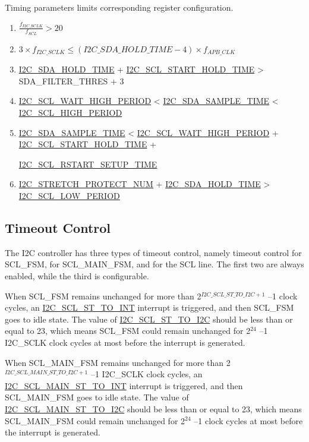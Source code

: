 \documentclass[main\_\_EN.tex]{subfiles}
\begin{document}
Timing parameters limits corresponding register configuration.
\begin{enumerate}
\item $\frac{f_{I2C\_SCLK}}{f_{SCL}}  > 20$
\item $3 \times f_{I2C\_SCLK} \leq (\hyperref[fielddesc:I2CSDAHOLDTIME]{I2C\_SDA\_HOLD\_TIME}-4) \times f_{APB\_CLK}$
\item \hyperref[fielddesc:I2CSDAHOLDTIME]{I2C\_SDA\_HOLD\_TIME} + \hyperref[fielddesc:I2CSCLSTARTHOLDTIME]{I2C\_SCL\_START\_HOLD\_TIME} > SDA\_FILTER\_THRES + 3
\item \hyperref[fielddesc:I2CSCLWAITHIGHPERIOD]{I2C\_SCL\_WAIT\_HIGH\_PERIOD} < \hyperref[fielddesc:I2CSDASAMPLETIME]{I2C\_SDA\_SAMPLE\_TIME} < \hyperref[fielddesc:I2CSCLHIGHPERIOD]{I2C\_SCL\_HIGH\_PERIOD}
\item \hyperref[fielddesc:I2CSDASAMPLETIME]{I2C\_SDA\_SAMPLE\_TIME} < \hyperref[fielddesc:I2CSCLWAITHIGHPERIOD]{I2C\_SCL\_WAIT\_HIGH\_PERIOD} + \hyperref[fielddesc:I2CSCLSTARTHOLDTIME]{I2C\_SCL\_START\_HOLD\_TIME} +

\hyperref[fielddesc:I2CSCLRSTARTSETUPTIME]{I2C\_SCL\_RSTART\_SETUP\_TIME}
\item \hyperref[fielddesc:I2CSTRETCHPROTECTNUM]{I2C\_STRETCH\_PROTECT\_NUM} + \hyperref[fielddesc:I2CSDAHOLDTIME]{I2C\_SDA\_HOLD\_TIME} > \hyperref[fielddesc:I2CSCLLOWPERIOD]{I2C\_SCL\_LOW\_PERIOD}
\end{enumerate}

\subsection{Timeout Control}
The I2C controller has three types of timeout control, namely timeout control for SCL\_FSM, for SCL\_MAIN\_FSM, and for the SCL line. The first two are always enabled, while the third is configurable.

When SCL\_FSM remains unchanged for more than 2$^{\hyperref[fielddesc:I2CSCLSTTOI2C]{I2C\_SCL\_ST\_TO\_I2C}+1}$ –1 clock cycles, an \hyperref[int:i2c-scl-fsm]{I2C\_SCL\_ST\_TO\_INT} interrupt is triggered, and then SCL\_FSM goes to idle state. The value of \hyperref[fielddesc:I2CSCLSTTOI2C]{I2C\_SCL\_ST\_TO\_I2C} should be less than or equal to 23, which means SCL\_FSM could remain unchanged for 2$^{24}$ –1 I2C\_SCLK clock cycles at most before the interrupt is generated.

When SCL\_MAIN\_FSM remains unchanged for more than 2$^{\hyperref[fielddesc:I2CSCLMAINSTTOI2C]{I2C\_SCL\_MAIN\_ST\_TO\_I2C}+1}$ –1 I2C\_SCLK clock cycles, an \hyperref[int:i2c-scl-main-fsm]{I2C\_SCL\_MAIN\_ST\_TO\_INT} interrupt is triggered, and then SCL\_MAIN\_FSM goes to idle state. The value of \hyperref[fielddesc:I2CSCLMAINSTTOI2C]{I2C\_SCL\_MAIN\_ST\_TO\_I2C} should be less than or equal to 23, which means SCL\_MAIN\_FSM could remain unchanged for 2$^{24}$ –1 clock cycles at most before the interrupt is generated.
\end{document}
